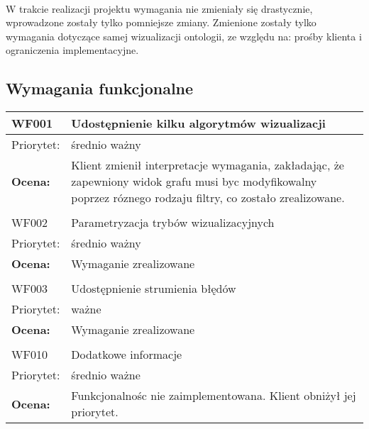 \documentclass[a4paper,10pt]{article}
\begin{document}
\paragraph{} W trakcie realizacji projektu wymagania nie zmieniały się drastycznie, wprowadzone zostały tylko pomniejsze zmiany. Zmienione zostały tylko wymagania dotyczące samej wizualizacji ontologii, ze względu na: prośby klienta i ograniczenia implementacyjne.




\subsection{Wymagania funkcjonalne}


\begin{center}

\begin{tabular}{|m{3cm}|m{9cm}|} \hline

WF001 & Udostępnienie kilku algorytmów wizualizacji \\ \hline
Priorytet: & średnio ważny\\ \hline
\textbf{Ocena:} & Klient zmienił interpretacje wymagania, zakładając, że zapewniony widok grafu musi byc modyfikowalny poprzez róznego rodzaju filtry, co zostało zrealizowane. \\ \hline
\multicolumn{2}{c}{} \\
 \hline

WF002 & Parametryzacja trybów wizualizacyjnych \\ \hline
Priorytet: & średnio ważny \\ \hline
\textbf{Ocena:} & Wymaganie zrealizowane \\ \hline
\multicolumn{2}{c}{} \\
 \hline

WF003 & Udostępnienie strumienia błędów \\ \hline
Priorytet: & ważne \\ \hline
\textbf{Ocena:} & Wymaganie zrealizowane \\ \hline
\multicolumn{2}{c}{} \\
 \hline

WF010 & Dodatkowe informacje \\ \hline
Priorytet: & średnio ważne \\ \hline
\textbf{Ocena:} & Funkcjonalnośc nie zaimplementowana. Klient obniżył jej priorytet. \\ \hline
\end{tabular}

\end{center}
\end{document}
